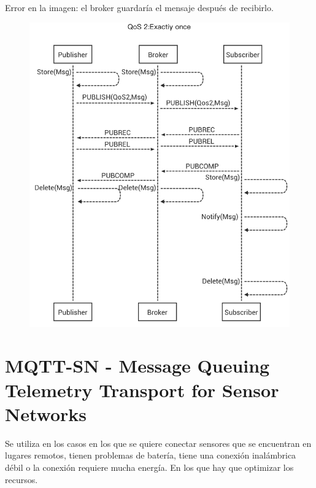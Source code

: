 \documentclass[12pt]{report} %
\begin{document}
\begin{description}
	Error en la imagen: el broker guardaría el mensaje después de recibirlo.
	\begin{figure}[H]
		{\includegraphics[scale=.35]{0_G6zwc_VftJ4AcueS.png}}
	\end{figure}
\end{description}
\pagebreak
\section{MQTT-SN - Message Queuing Telemetry Transport for Sensor Networks}
Se utiliza en los casos en los que se quiere conectar sensores que se encuentran en lugares remotos, tienen problemas de batería, tiene una conexión inalámbrica débil o la conexión requiere mucha energía. En los que hay que optimizar los recursos.
\end{document}
